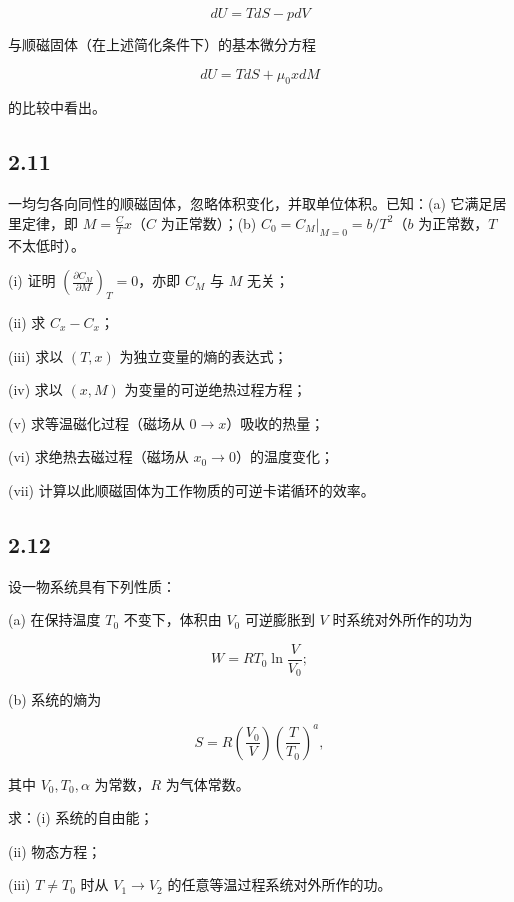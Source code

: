$$dU = TdS - pdV$$

与顺磁固体（在上述简化条件下）的基本微分方程

$$dU = TdS + \mu_0 x dM$$

的比较中看出。

\newpage
\subsection{2.11}
一均匀各向同性的顺磁固体，忽略体积变化，并取单位体积。已知：(a) 它满足居里定律，即 $M = \frac{C}{T} x$（$C$ 为正常数）；(b) $C_0 = C_{M}|_{M=0} = b/T^{2}$（$b$ 为正常数，$T$ 不太低时）。

(i) 证明 $\left( \frac{\partial C_{M}}{\partial M} \right)_{T} = 0$，亦即 $C_{M}$ 与 $M$ 无关；

(ii) 求 $C_{x} - C_{x}$；

(iii) 求以 $(T, x)$ 为独立变量的熵的表达式；

(iv) 求以 $(x, M)$ 为变量的可逆绝热过程方程；

(v) 求等温磁化过程（磁场从 $0 \rightarrow x$）吸收的热量；

(vi) 求绝热去磁过程（磁场从 $x_0 \rightarrow 0$）的温度变化；

(vii) 计算以此顺磁固体为工作物质的可逆卡诺循环的效率。

\newpage
\subsection{2.12}
设一物系统具有下列性质：

(a) 在保持温度 $T_0$ 不变下，体积由 $V_0$ 可逆膨胀到 $V$ 时系统对外所作的功为

$$W = RT_0 \ln \frac{V}{V_0};$$

(b) 系统的熵为

$$S = R \left( \frac{V_0}{V} \right) \left( \frac{T}{T_0} \right)^a,$$

其中 $V_0, T_0, \alpha$ 为常数，$R$ 为气体常数。

求：(i) 系统的自由能；

(ii) 物态方程；

(iii) $T \neq T_0$ 时从 $V_1 \to V_2$ 的任意等温过程系统对外所作的功。